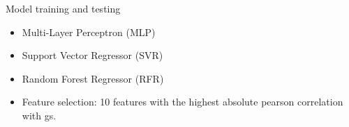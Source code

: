 \begin{frame}{Model training and testing}
    \begin{itemize}
        \item Multi-Layer Perceptron (MLP)
        \item Support Vector Regressor (SVR)
        \item Random Forest Regressor (RFR)
    \end{itemize} 
    \vspace{1cm}
    \begin{itemize}
        \item Feature selection: 10 features with the highest absolute pearson correlation with gs.
    \end{itemize}

\end{frame}


